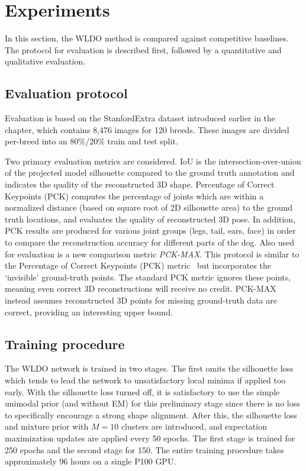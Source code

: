 \section{Experiments}



In this section, the WLDO method is compared against competitive baselines. The protocol for evaluation is described first, followed by a quantitative and qualitative evaluation.

\subsection{Evaluation protocol}

Evaluation is based on the StanfordExtra dataset introduced earlier in the chapter, which contains 8,476 images for 120 breeds. These images are divided per-breed into an 80\%/20\% train and test split.

Two primary evaluation metrics are considered. IoU is the intersection-over-union of the projected model silhouette compared to the ground truth annotation and indicates the quality of the reconstructed 3D shape. Percentage of Correct Keypoints (PCK) computes the percentage of joints which are within a normalized distance (based on square root of 2D silhouette area) to the ground truth locations, and evaluates the quality of reconstructed 3D pose. In addition, PCK results are produced for various joint groups (legs, tail, ears, face) in order to compare the reconstruction accuracy for different parts of the dog. Also used for evaluation is a new comparison metric \emph{PCK-MAX}. This protocol is similar to the Percentage of Correct Keypoints (PCK) metric~\cite{yang2013articulated} but incorporates the `invisible' ground-truth points. The standard PCK metric ignores these points, meaning even correct 3D reconstructions will receive no credit. PCK-MAX instead assumes reconstructed 3D points for missing ground-truth data are correct, providing an interesting upper bound.

\subsection{Training procedure}

The WLDO network is trained in two stages. The first omits the silhouette loss which tends to lead the network to unsatisfactory local minima if applied too early. With the silhouette loss turned off, it is satisfactory to use the simple unimodal prior (and without EM) for this preliminary stage since there is no loss to specifically encourage a strong shape alignment. After this, the silhouette loss and mixture prior with $M=10$ clusters are introduced, and expectation maximization updates are applied every 50 epochs. The first stage is trained for 250 epochs and the second stage for 150. The entire training procedure takes approximately 96 hours on a single P100 GPU.


